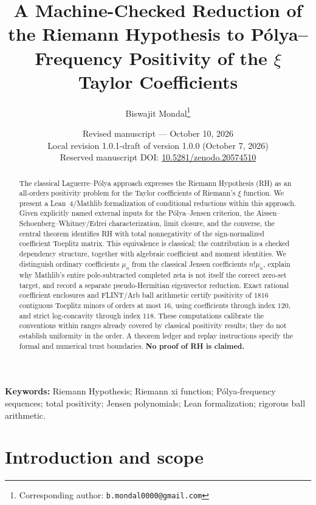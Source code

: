 \documentclass[11pt]{article}
\title{\bfseries A Machine-Checked Reduction of the Riemann Hypothesis to
Pólya--Frequency Positivity of the $\xi$ Taylor Coefficients}
\author{Biswajit Mondal\thanks{Corresponding author: \texttt{b.mondal0000@gmail.com}}}
\date{Revised manuscript --- October 10, 2026\\[2pt]
\small Local revision 1.0.1-draft of version 1.0.0 (October 7, 2026)\\
Reserved manuscript DOI: \href{https://doi.org/10.5281/zenodo.20574510}{10.5281/zenodo.20574510}}
\theoremstyle{plain}
\theoremstyle{definition}
\theoremstyle{remark}
\begin{document}
\maketitle

\begin{abstract}
The classical Laguerre--Pólya approach expresses the Riemann Hypothesis (RH)
as an all-orders positivity problem for the Taylor coefficients of Riemann's
$\xi$ function. We present a Lean~4/Mathlib formalization of conditional
reductions within this approach. Given explicitly named external inputs for
the Pólya--Jensen criterion, the Aissen--Schoenberg--Whitney/Edrei
characterization, limit closure, and the converse, the central theorem
identifies RH with total nonnegativity of the sign-normalized coefficient
Toeplitz matrix. This equivalence is classical; the contribution is a checked
dependency structure, together with algebraic coefficient and moment
identities. We distinguish ordinary coefficients $\mu_n$ from the classical
Jensen coefficients $n!\mu_n$, explain why Mathlib's entire pole-subtracted
completed zeta is not itself the correct zero-set target, and record a
separate pseudo-Hermitian eigenvector reduction. Exact rational coefficient
enclosures and FLINT/Arb ball arithmetic certify positivity of $1816$
contiguous Toeplitz minors of orders at most $16$, using coefficients through
index $120$, and strict log-concavity through index $118$. These computations
calibrate the conventions within ranges already covered by classical
positivity results; they do not establish uniformity in the order. A theorem
ledger and replay instructions specify the formal and numerical trust
boundaries. \textbf{No proof of RH is claimed.}
\end{abstract}

\noindent\textbf{Keywords:} Riemann Hypothesis; Riemann xi function;
Pólya-frequency sequences; total positivity; Jensen polynomials;
Lean formalization; rigorous ball arithmetic.

\tableofcontents

\section{Introduction and scope}
\end{document}
